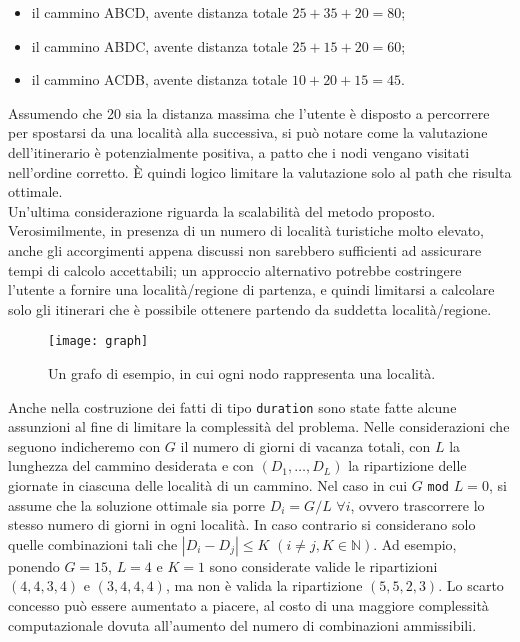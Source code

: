 \begin{itemize}
\item il cammino ABCD, avente distanza totale $25 + 35 + 20 = 80$;
\item il cammino ABDC, avente distanza totale $25 + 15 + 20 = 60$;
\item il cammino ACDB, avente distanza totale $10 + 20 + 15 = 45$.
\end{itemize}

Assumendo che 20 sia la distanza massima che l'utente è disposto a percorrere per spostarsi da una località alla successiva, si può notare come la valutazione dell'itinerario è potenzialmente positiva, a patto che i nodi vengano visitati nell'ordine corretto. È quindi logico limitare la valutazione solo al path che risulta ottimale.\\
Un'ultima considerazione riguarda la scalabilità del metodo proposto. Verosimilmente, in presenza di un numero di località turistiche molto elevato, anche gli accorgimenti appena discussi non sarebbero sufficienti ad assicurare tempi di calcolo accettabili; un approccio alternativo potrebbe costringere l'utente a fornire una località/regione di partenza, e quindi limitarsi a calcolare solo gli itinerari che è possibile ottenere partendo da suddetta località/regione. \\

\begin{figure}[h]
  \centering
  \texttt{[image: graph]}
  \caption{Un grafo di esempio, in cui ogni nodo rappresenta una località.}
  \label{graph}
\end{figure}

Anche nella costruzione dei fatti di tipo \texttt{duration} sono state fatte alcune assunzioni al fine di limitare la complessità del problema. Nelle considerazioni che seguono indicheremo con $G$ il numero di giorni di vacanza totali, con $L$ la lunghezza del cammino desiderata e con $(D_1, \dots, D_L)$ la ripartizione delle giornate in ciascuna delle località di un cammino. Nel caso in cui $G$ \texttt{mod} $L = 0$,  si assume che la soluzione ottimale sia porre $ D_i = G/L$  $\forall i$, ovvero trascorrere lo stesso numero di giorni in ogni località. In caso contrario si considerano solo quelle combinazioni tali che $| D_i - D_j | \leq K$ $(i \not = j , K \in \mathbb{N})$. Ad esempio, ponendo  $G = 15$, $L = 4$ e $ K = 1$ sono considerate valide le ripartizioni $(4, 4, 3, 4)$ e $(3, 4, 4, 4)$, ma non è valida la ripartizione $(5, 5, 2, 3)$. Lo scarto concesso può essere aumentato a piacere, al costo di una maggiore complessità computazionale dovuta all'aumento del numero di combinazioni ammissibili. \\

